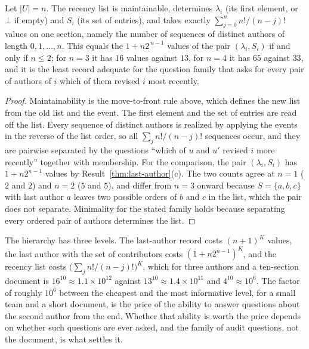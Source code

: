 \begin{newresult}\label{prop:recency}
Let $|U|=n$. The recency list is maintainable, determines $\lambda_i$ (its first element, or $\bot$ if empty) and $S_i$ (its set of entries), and takes exactly $\sum_{j=0}^{n}n!/(n-j)!$ values on one section, namely the number of sequences of distinct authors of length $0,1,\dots,n$. This equals the $1+n2^{\,n-1}$ values of the pair $(\lambda_i,S_i)$ if and only if $n\le2$; for $n=3$ it has $16$ values against $13$, for $n=4$ it has $65$ against $33$, and it is the least record adequate for the question family that asks for every pair of authors of $i$ which of them revised $i$ most recently.
\end{newresult}
\begin{proof}
Maintainability is the move-to-front rule above, which defines the new list from the old list and the event. The first element and the set of entries are read off the list. Every sequence of distinct authors is realized by applying the events in the reverse of the list order, so all $\sum_j n!/(n-j)!$ sequences occur, and they are pairwise separated by the questions ``which of $u$ and $u'$ revised $i$ more recently'' together with membership. For the comparison, the pair $(\lambda_i,S_i)$ has $1+n2^{n-1}$ values by Result~\ref{thm:last-author}(c). The two counts agree at $n=1$ ($2$ and $2$) and $n=2$ ($5$ and $5$), and differ from $n=3$ onward because $S=\{a,b,c\}$ with last author $a$ leaves two possible orders of $b$ and $c$ in the list, which the pair does not separate. Minimality for the stated family holds because separating every ordered pair of authors determines the list.
\end{proof}

The hierarchy has three levels. The last-author record costs $(n+1)^{K}$ values, the last author with the set of contributors costs $(1+n2^{n-1})^{K}$, and the recency list costs $\bigl(\sum_j n!/(n-j)!\bigr)^{K}$, which for three authors and a ten-section document is $16^{10}\approx 1.1\times10^{12}$ against $13^{10}\approx1.4\times10^{11}$ and $4^{10}\approx10^{6}$. The factor of roughly $10^{6}$ between the cheapest and the most informative level, for a small team and a short document, is the price of the ability to answer questions about the second author from the end. Whether that ability is worth the price depends on whether such questions are ever asked, and the family of audit questions, not the document, is what settles it.

